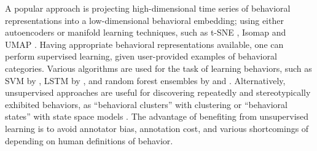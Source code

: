 A popular approach is projecting high-dimensional time series of behavioral representations into a low-dimensional behavioral embedding; using either autoencoders \citep{whiteway_partitioning_2021, graving_vae-sne_2020} or manifold learning techniques, such as t-SNE \citep{maaten_visualizing_2008}, Isomap \citep{tenenbaum_global_2000} and UMAP \citep{mcinnes_umap_2020} \citep{berman_mapping_2014, marshall_continuous_2021, hsu_b-soid_2021, deangelis_manifold_2019, mearns_deconstructing_2020}.
Having appropriate behavioral representations available, one can perform supervised learning, given user-provided examples of behavioral categories.
Various algorithms are used for the task of learning behaviors, such as SVM \citet{boser_training_1992} by \citet{hsu_b-soid_2021}, LSTM \citep{hochreiter_long_1997} by \citet{wu_neural_2021}, and random forest ensembles \citep{breiman_random_2001} by \citet{kabra_jaaba_2013} and \citet{nilsson_simple_2020}.
Alternatively, unsupervised approaches are useful for discovering repeatedly and stereotypically exhibited behaviors, as ``behavioral clusters'' with clustering \citep{berman_mapping_2014, todd_systematic_2017, marques_structure_2018, marshall_continuous_2021} or ``behavioral states'' with state space models \citep{wiltschko_mapping_2015}.
The advantage of benefiting from unsupervised learning is to avoid annotator bias, annotation cost, and various shortcomings of depending on human definitions of behavior.

